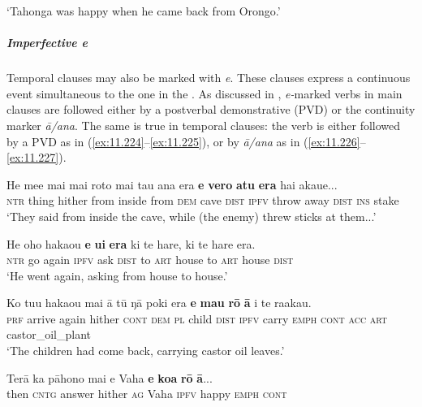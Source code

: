 \glt 
‘Tahonga was happy when he came back from Orongo.’ \textstyleExampleref{[R301.316]} 
\z

\subparagraph{Imperfective \textit{e}} Temporal clauses may also be marked with  \textit{e}. These clauses express a continuous event simultaneous to the one in the . As discussed in , \textit{e-}marked verbs in main clauses are followed either by a postverbal demonstrative (PVD) or the continuity marker \textit{{\ꞌ}ā/{\ꞌ}ana}. The same is true in temporal clauses: the verb is either followed by a PVD as in (\ref{ex:11.224}–\ref{ex:11.225}), or by \textit{{\ꞌ}ā/{\ꞌ}ana} as in (\ref{ex:11.226}–\ref{ex:11.227}).

\ea\label{ex:11.224}
\gll He me{\ꞌ}e mai mai roto mai tau {\ꞌ}ana era \textbf{e} \textbf{vero} \textbf{atu} \textbf{era} hai akaue... \\
\textsc{ntr} thing hither from inside from \textsc{dem} cave \textsc{dist} \textsc{ipfv} throw away \textsc{dist} \textsc{ins} stake \\

\glt 
‘They said from inside the cave, while (the enemy) threw sticks at them...’ \textstyleExampleref{[Mtx-3-02.042]}
\z

\ea\label{ex:11.225}
\gll He oho haka{\ꞌ}ou \textbf{e} \textbf{{\ꞌ}ui} \textbf{era} ki te hare, ki te hare era. \\
\textsc{ntr} go again \textsc{ipfv} ask \textsc{dist} to \textsc{art} house to \textsc{art} house \textsc{dist} \\

\glt 
‘He went again, asking from house to house.’ \textstyleExampleref{[R310.152]} 
\z

\ea\label{ex:11.226}
\gll Ko tu{\ꞌ}u haka{\ꞌ}ou mai {\ꞌ}ā tū ŋā poki era \textbf{e} \textbf{ma{\ꞌ}u} \textbf{rō} \textbf{{\ꞌ}ā}  i te ra{\ꞌ}akau.\\
\textsc{prf} arrive again hither \textsc{cont} \textsc{dem} \textsc{pl} child \textsc{dist} \textsc{ipfv} carry \textsc{emph} \textsc{cont}  \textsc{acc} \textsc{art} castor\_oil\_plant\\

\glt 
‘The children had come back, carrying castor oil leaves.’ \textstyleExampleref{[R313.053]} 
\z

\ea\label{ex:11.227}
\gll Terā ka pāhono mai e Vaha \textbf{e} \textbf{koa} \textbf{rō} \textbf{{\ꞌ}ā}... \\
then \textsc{cntg} answer hither \textsc{ag} Vaha \textsc{ipfv} happy \textsc{emph} \textsc{cont} \\

